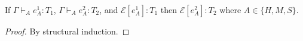 \begin{lemma}
\label{ecp}
\onehalfspacing
If $\Gamma\vdash_{A}e_{A}^{1}:T_{1}$, $\Gamma\vdash_{A}e_{A}^{2}:T_{2}$, and $\mathscr{E}[e_{A}^{1}]:T_{1}$ then $\mathscr{E}[e_{A}^{2}]:T_{2}$ where $A\in\lbrace H,M,S\rbrace$.
\begin{proof}
By structural induction.
\end{proof}
\end{lemma}
